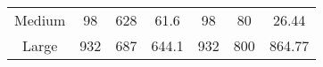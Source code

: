 \documentclass[letterpaper,twocolumn,10pt]{article}
\begin{document}
\begin{table*}[h]
\begin{tabular}{|ccccccc|}
\multicolumn{1}{|c|}{Medium} & \multicolumn{1}{c|}{98}                                                         & \multicolumn{1}{c|}{628}                                                                  & \multicolumn{1}{c|}{61.6}                                                                     & \multicolumn{1}{c|}{98}                                                           & \multicolumn{1}{c|}{80}                                                            & 26.44                                                                      \\
\multicolumn{1}{|c|}{Large}  & \multicolumn{1}{c|}{932}                                                        & \multicolumn{1}{c|}{687}                                                                  & \multicolumn{1}{c|}{644.1}                                                                    & \multicolumn{1}{c|}{932}                                                          & \multicolumn{1}{c|}{800}                                                           & 864.77                                                                     \\ \hline
\end{tabular}
\end{table*}












\clearpage
\end{document}
